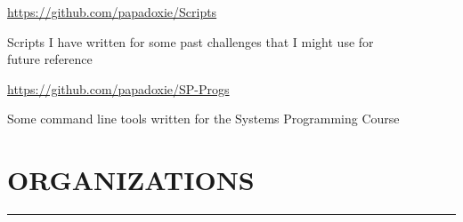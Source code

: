 \documentclass[]{resume}
\begin{document}
\hfill
\begin{minipage}[t]{0.66\textwidth}

    \vspace{-55.9pt}


     
    \href{https://github.com/papadoxie/Scripts}{https://github.com/papadoxie/Scripts}\\
    \vspace{4pt}
    \begin{minipage}{0.85\textwidth\vspace{2pt}}
        Scripts I have written for some past challenges that I might use for\\future reference
    \end{minipage}

    \vspace{8pt}
     
    \href{https://github.com/papadoxie/SP-Progs}{https://github.com/papadoxie/SP-Progs}\\
    \vspace{4pt}
    \begin{minipage}{0.85\textwidth\vspace{2pt}}
        Some command line tools written for the Systems Programming Course
    \end{minipage}


    \section{ORGANIZATIONS}
    \noindent\rule{12.80cm}{0.4pt}

     
    \noindent

    \vspace{8pt}
     

\end{minipage}
\end{document}
